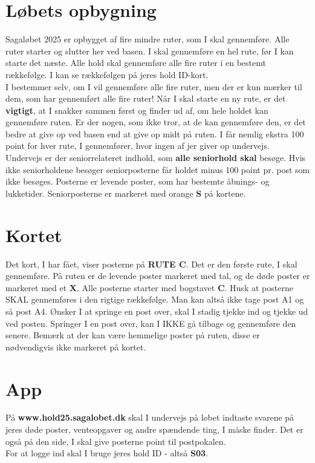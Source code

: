 \section{Løbets opbygning}
Sagaløbet 2025 er opbygget af fire mindre ruter, som I skal gennemføre. Alle ruter starter og slutter her ved basen. I skal gennemføre en hel rute, før I kan starte det næste. Alle hold skal gennemføre alle fire ruter i en bestemt rækkefølge. I kan se rækkefølgen på jeres hold ID-kort.\\\newline
I bestemmer selv, om I vil gennemføre alle fire ruter, men der er kun mærker til dem, som har gennemført alle fire ruter! Når I skal starte en ny rute, er det \textbf{vigtigt}, at I snakker sammen først og finder ud af, om hele holdet kan gennemføre ruten. Er der nogen, som ikke tror, at de kan gennemføre den, er det bedre at give op ved basen end at give op midt på ruten. I får nemlig ekstra 100 point for hver rute, I gennemfører, hvor ingen af jer giver op undervejs.\\
\newline
Undervejs er der seniorrelateret indhold, som \textbf{alle seniorhold skal} besøge. Hvis ikke seniorholdene besøger seniorposterne får holdet minus 100 point pr. post som ikke besøges. Posterne er levende poster, som har bestemte åbnings- og lukketider. Seniorposterne er markeret med orange \textbf{S} på kortene.\\
\newline
\section{Kortet}
Det kort, I har fået, viser posterne på \textbf{RUTE C}. Det er den første rute, I skal gennemføre. På ruten er de levende poster markeret med tal, og de døde poster er markeret med et \textbf{X}. Alle posterne starter med bogstavet \textbf{C}. Husk at posterne SKAL gennemføres i den rigtige rækkefølge. Man kan altså ikke tage post A1 og så post A4. Ønsker I at springe en post over, skal I stadig tjekke ind og tjekke ud ved posten. Springer I en post over, kan I IKKE gå tilbage og gennemføre den senere. Bemærk at der kan være hemmelige poster på ruten, disse er nødvendigvis ikke markeret på kortet.
\section{App}
På \textbf{www.hold25.sagalobet.dk} skal I undervejs på løbet indtaste svarene på jeres døde poster, venteopgaver og andre spændende ting, I måske finder. Det er også på den side, I skal give posterne point til postpokalen.\\
For at logge ind skal I bruge jeres hold ID - altså \textbf{S03}.
\newpage
